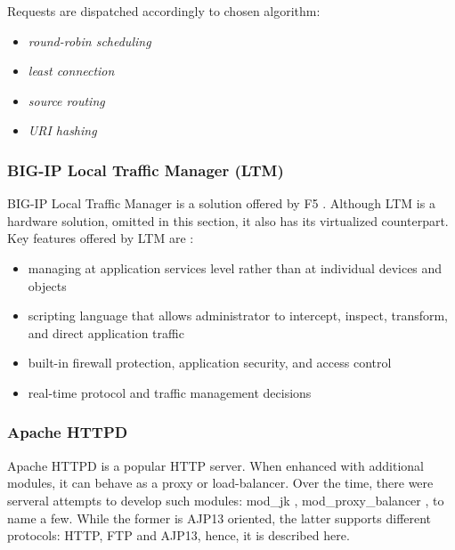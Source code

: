 Requests are dispatched accordingly to chosen algorithm:
\begin{itemize}
  \item \textit{round-robin scheduling}
  \item \textit{least connection}
  \item \textit{source routing}
  \item \textit{URI hashing}
\end{itemize}

\subsubsection*{BIG-IP Local Traffic Manager (LTM)}
BIG-IP Local Traffic Manager is a solution offered by F5 \cite{F5}. Although LTM is a hardware solution, omitted in this section, it also has its virtualized counterpart. Key features offered by LTM are \cite{LTM}:
\begin{itemize}
  \item managing at application services level rather than at individual devices and objects
  \item scripting language that allows administrator to intercept, inspect, transform, and direct application traffic
  \item built-in firewall protection, application security, and access control
  \item real-time protocol and traffic management decisions
\end{itemize}

\subsubsection*{Apache HTTPD}
Apache HTTPD \cite{ApacheHTTPD} is a popular HTTP server. When enhanced with additional modules, it can behave as a proxy or load-balancer. Over the time, there were serveral attempts to develop such modules: mod\_jk \cite{ApacheModJk}, mod\_proxy\_balancer \cite{ApacheModProxyBalancer}, to name a few. While the former is AJP13 oriented, the latter supports different protocols: HTTP, FTP and AJP13, hence, it is described here.

